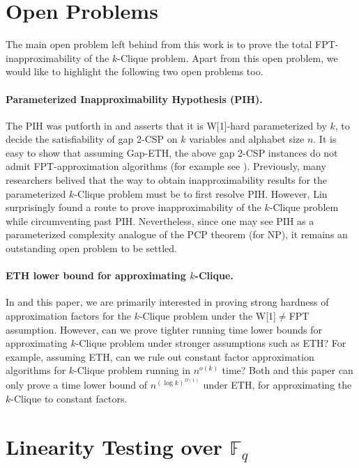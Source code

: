 \documentclass[10pt,a4paper]{article}
\newcommand{\F}{\mathbb{F}}
\begin{document}
\section{Open Problems}\label{sec:open}

The main open problem left behind from this work is to prove the total FPT-inapproximability of the $k$-Clique problem. Apart from this open problem, we would like to highlight the following two open problems too. 

\paragraph{Parameterized Inapproximability Hypothesis (PIH).} The PIH was putforth in \cite{LRSZ20} and asserts that it is W[1]-hard parameterized by $k$, to decide the satisfiability of gap 2-CSP on $k$ variables and alphabet size $n$. It is easy to show that assuming  Gap-ETH, the above gap 2-CSP instances do not admit FPT-approximation algorithms  (for example see \cite{BGKM18}). Previously, many researchers belived that the way to obtain  inapproximability results for the parameterized $k$-Clique problem must be to first resolve PIH. However, Lin \cite{L21} surprisingly found a route  to prove  inapproximability of the $k$-Clique problem while circumventing past PIH.   Nevertheless, since one may see PIH as a parameterized complexity analogue of the PCP theorem (for NP), it remains an outstanding open problem to be settled.  

\paragraph{ETH lower bound for approximating $k$-Clique.}
In \cite{L21} and this paper, we are primarily interested in proving strong hardness of approximation factors for the $k$-Clique problem under the W[1]$\neq$FPT assumption.  However, can we prove tighter running time lower bounds for approximating $k$-Clique problem under stronger assumptions such as ETH? For example, assuming ETH, can we rule out constant factor approximation algorithms for $k$-Clique problem running in $n^{o(k)}$ time? 
Both \cite{L21} and this paper can only prove a time lower bound of $n^{(\log k)^{\Omega(1)}}$ under ETH, for  approximating the $k$-Clique to constant factors. 

 \appendix
 
 \section{Linearity Testing over $\F_q$}\label{sec:appendix}
\end{document}
